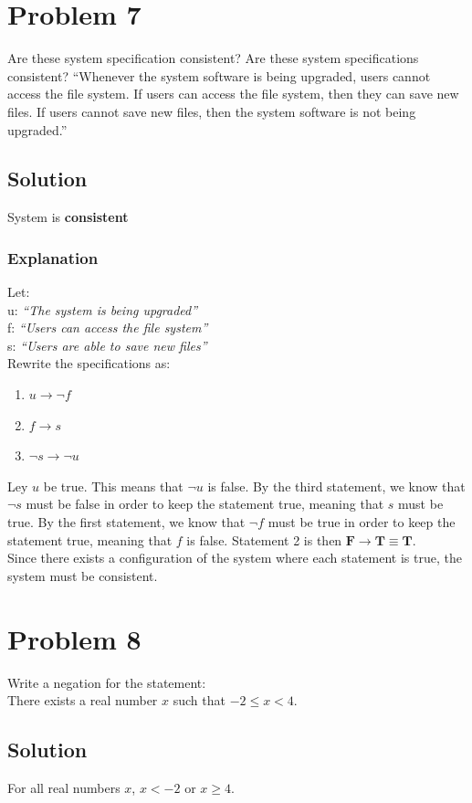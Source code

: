 \documentclass[table]{article}
\begin{document}
\section{Problem 7}
Are these system specification consistent?
Are these system specifications consistent? ``Whenever the system software is being upgraded, users cannot access the file system. If users can access the file system, then they can save new files. If users cannot save new files, then the system software is not being upgraded.''
\subsection{Solution}
System is \textbf{consistent}
\subsubsection{Explanation}
Let:\\
\indent u: \emph{``The system is being upgraded''}\\
\indent f: \emph{``Users can access the file system''}\\
\indent s: \emph{``Users are able to save new files''}\\
Rewrite the specifications as:
\begin{enumerate}[nosep, label=\arabic*)]
\item $u \rightarrow \neg f$
\item $f \rightarrow s$
\item $\neg s \rightarrow \neg u$
\end{enumerate}
Ley $u$ be true. This means that $\neg u$ is false. By the third statement, we know that $\neg s$ must be false in order to keep the statement true, meaning that $s$ must be true. By the first statement, we know that $\neg f$ must be true in order to keep the statement true, meaning that $f$ is false. Statement 2 is then $\textbf{F} \rightarrow \textbf{T} \equiv \textbf{T}$.\\
Since there exists a configuration of the system where each statement is true, the system must be consistent.
\section{Problem 8}
Write a negation for the statement:\\
There exists a real number $x$ such that $-2 \leq x < 4$.
\subsection{Solution}
For all real numbers $x$, $x < -2$ or $x \geq 4$.
\end{document}
